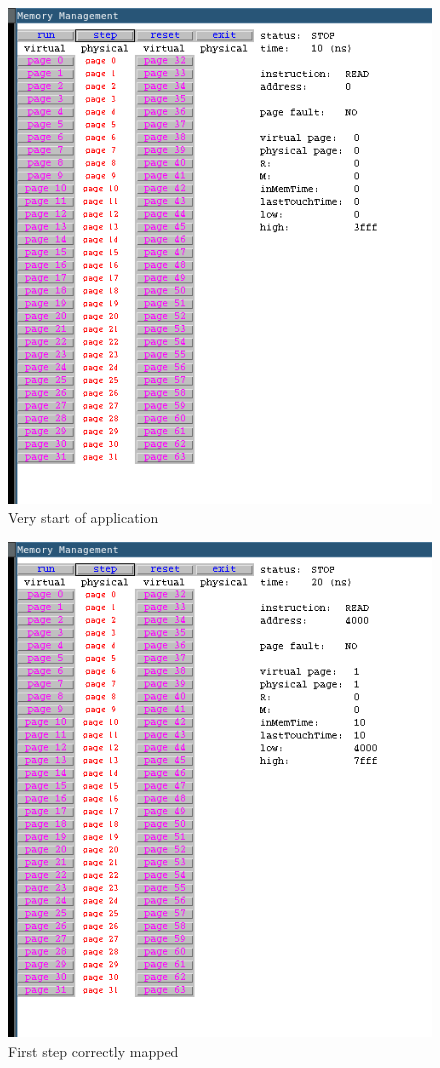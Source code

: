 \documentclass{article}
\begin{document}
\begin{figure}[H]
	\caption{Very start of application}
	\includegraphics[width=\linewidth]{mm1}
\end{figure}
\begin{figure}[H]                  
        \caption{First step correctly mapped}
	\includegraphics[width=\linewidth]{mm2}
\end{figure}     
\end{document}

